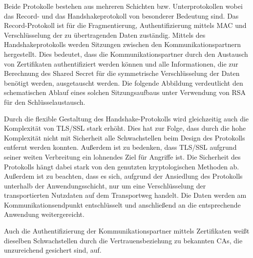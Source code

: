 Beide Protokolle bestehen aus mehreren Schichten bzw. Unterprotokollen wobei das Record- und das Handshakeprotokoll von besonderer Bedeutung sind. 
Das Record-Protokoll ist für die Fragmentierung, Authentifizierung mittels \ac{MAC} und Verschlüsselung der zu übertragenden Daten zuständig. 
Mittels des Handshakeprotokolls werden Sitzungen zwischen den Kommunikationspartnern hergestellt. 
Dies bedeutet, dass die Kommunikationspartner durch den Austausch von Zertifikaten authentifiziert werden können und alle Informationen, die zur Berechnung des Shared Secret für die symmetrische Verschlüsselung der Daten benötigt werden, ausgetauscht werden. 
Die folgende Abbildung verdeutlicht den schematischen Ablauf eines solchen Sitzungsaufbaus unter Verwendung von \ac{RSA} für den Schlüsselaustausch.

Durch die flexible Gestaltung des Handshake-Protokolls wird gleichzeitig auch die Komplexität von \ac{TLS/SSL} stark erhöht. 
Dies hat zur Folge, dass durch die hohe Komplexität nicht mit Sicherheit alle Schwachstellen beim Design des Protokolls entfernt werden konnten. 
Außerdem ist zu bedenken, dass \ac{TLS/SSL} aufgrund seiner weiten Verbreitung ein lohnendes Ziel für Angriffe ist. Die Sicherheit des Protokolls hängt dabei stark von den genutzten kryptologischen Methoden ab. 
Außerdem ist zu beachten, dass es sich, aufgrund der Ansiedlung des Protokolls unterhalb der Anwendungsschicht, nur um eine Verschlüsselung der transportierten Nutzdaten auf dem Transportweg handelt. 
Die Daten werden am Kommunikationsendpunkt entschlüsselt und anschließend an die entsprechende Anwendung weitergereicht.

Auch die Authentifizierung der Kommunikationspartner mittels Zertifikaten weißt dieselben Schwachstellen durch die Vertrauensbeziehung zu bekannten \ac{CA}s, die unzureichend gesichert sind, auf.  